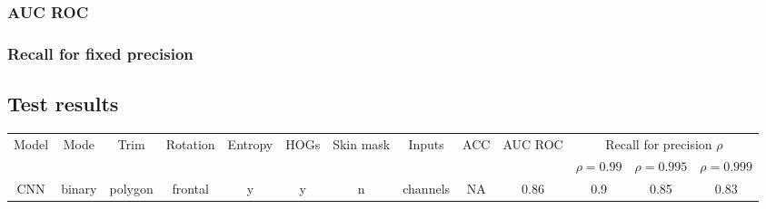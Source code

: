         \subsubsection*{AUC ROC}

        \subsubsection*{Recall for fixed precision}


    \subsection{Test results}
        \begin{tabular}{ |c|c|c|c|c|c|c|c|c|c|c|c|c| }
            \hline
            \multirow{2}{*}{Model} &
            \multirow{2}{*}{Mode} &
            \multirow{2}{*}{Trim} &
            \multirow{2}{*}{Rotation} &
            \multirow{2}{*}{Entropy} &
            \multirow{2}{*}{HOGs} &
            \multirow{2}{*}{Skin mask} &
            \multirow{2}{*}{Inputs} &
            \multirow{2}{*}{ACC} &
            \multirow{2}{*}{AUC ROC} &
            \multicolumn{3}{|c|}{Recall for precision $\rho$} \\
            & & & & & & & & & & $\rho = 0.99$ & $\rho = 0.995$ & $\rho = 0.999$ \\
            \hline
            CNN & binary & polygon & frontal & y & y & n & channels & NA & 0.86 & 0.9 & 0.85 & 0.83 \\
            \hline
        \end{tabular}
